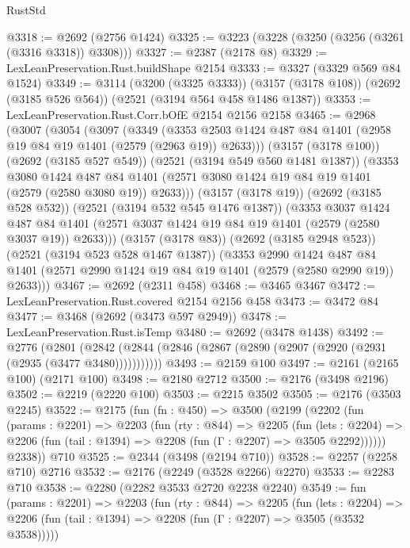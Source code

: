 \begin{lexlean}{RustStd}
\begin{coremodule}
{\begin{coremodule}
{{{{{{{{{{@3318 := @2692 (@2756 @1424)
@3325 := @3223 (@3228 (@3250 (@3256 (@3261 (@3316 @3318)) @3308)))
@3327 := @2387 (@2178 @8)
@3329 := LexLeanPreservation.Rust.buildShape @2154
@3333 := @3327 (@3329 @569 @84 @1524)
@3349 := @3114
    (@3200 (@3325 @3333))
    (@3157 (@3178 @108))
    (@2692 (@3185 @526 @564))
    (@2521 (@3194 @564 @458 @1486 @1387))
@3353 := LexLeanPreservation.Rust.Corr.bOfE @2154 @2156 @2158
@3465 := @2968
    (@3007
      (@3054
        (@3097
          (@3349
            (@3353 @2503 @1424 @487 @84 @1401 (@2958 @19 @84 @19 @1401 (@2579 (@2963 @19)) @2633)))
          (@3157 (@3178 @100))
          (@2692 (@3185 @527 @549))
          (@2521 (@3194 @549 @560 @1481 @1387))
          (@3353
            @3080
            @1424
            @487
            @84
            @1401
            (@2571 @3080 @1424 @19 @84 @19 @1401 (@2579 (@2580 @3080 @19)) @2633)))
        (@3157 (@3178 @19))
        (@2692 (@3185 @528 @532))
        (@2521 (@3194 @532 @545 @1476 @1387))
        (@3353
          @3037
          @1424
          @487
          @84
          @1401
          (@2571 @3037 @1424 @19 @84 @19 @1401 (@2579 (@2580 @3037 @19)) @2633)))
      (@3157 (@3178 @83))
      (@2692 (@3185 @2948 @523))
      (@2521 (@3194 @523 @528 @1467 @1387))
      (@3353
        @2990
        @1424
        @487
        @84
        @1401
        (@2571 @2990 @1424 @19 @84 @19 @1401 (@2579 (@2580 @2990 @19)) @2633)))
@3467 := @2692 (@2311 @458)
@3468 := @3465 @3467
@3472 := LexLeanPreservation.Rust.covered @2154 @2156 @458
@3473 := @3472 @84
@3477 := @3468 (@2692 (@3473 @597 @2949))
@3478 := LexLeanPreservation.Rust.isTemp
@3480 := @2692 (@3478 @1438)
@3492 := @2776
    (@2801 (@2842 (@2844 (@2846 (@2867 (@2890 (@2907 (@2920 (@2931 (@2935 (@3477 @3480)))))))))))
@3493 := @2159 @100
@3497 := @2161 (@2165 @100) (@2171 @100)
@3498 := @2180 @2712
@3500 := @2176 (@3498 @2196)
@3502 := @2219 (@2220 @100)
@3503 := @2215 @3502
@3505 := @2176 (@3503 @2245)
@3522 := @2175
    (fun (fn : @450) =>
    @3500
      (@2199
        (@2202
          (fun (params : @2201) =>
          @2203
            (fun (rty : @844) =>
            @2205
              (fun (lets : @2204) =>
              @2206 (fun (tail : @1394) => @2208 (fun (Γ : @2207) => @3505 @2292))))))
        @2338))
    @710
@3525 := @2344 (@3498 (@2194 @710))
@3528 := @2257 (@2258 @710) @2716
@3532 := @2176 (@2249 (@3528 @2266) @2270)
@3533 := @2283 @710
@3538 := @2280 (@2282 @3533 @2720 @2238 @2240)
@3549 := fun (params : @2201) =>
  @2203
    (fun (rty : @844) =>
    @2205
      (fun (lets : @2204) =>
      @2206 (fun (tail : @1394) => @2208 (fun (Γ : @2207) => @3505 (@3532 @3538)))))
}}}}}}}}}}
\end{coremodule}}
\end{coremodule}
\end{lexlean}
